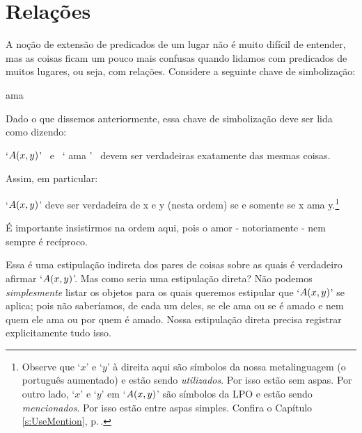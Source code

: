 \section{Relações}
A noção de extensão de predicados de um lugar não é muito difícil de entender, mas as coisas ficam um pouco mais confusas quando lidamos com predicados de muitos lugares, ou seja, com relações.
Considere a seguinte chave de simbolização:
\begin{center}
	\begin{ekey}
		\item[\atom{A}{x,y}]  ama 
	\end{ekey}
\end{center}
Dado o que dissemos anteriormente, essa chave de simbolização deve ser lida como dizendo:
	\begin{earg}
		\item[\textbullet] `$\mathord{A}(x,y)$'  \ e \ ` ama ' \ devem ser verdadeiras exatamente das mesmas coisas.
	\end{earg}
Assim, em particular:
	\begin{earg}
		\item[\textbullet] `$\mathord{A}(x,y)$' deve ser verdadeira de x e y (nesta ordem) se e somente se x ama y.\footnote{
			Observe que `$x$' e `$y$' à direita aqui são símbolos da nossa metalinguagem (o português aumentado) e estão sendo \emph{utilizados}.
			Por isso estão sem aspas.
			Por outro lado, `$x$' e `$y$' em `$\mathord{A}(x, y)$' são símbolos da LPO e estão sendo \emph{mencionados}.
			Por isso estão entre aspas simples.
			Confira o Capítulo \ref{s:UseMention}, p.\,\pageref{s:UseMention}.} 
	\end{earg}
É importante insistirmos na ordem aqui, pois o amor - notoriamente - nem sempre é recíproco.

Essa é uma estipulação indireta dos pares de coisas  sobre as quais é verdadeiro afirmar `$\mathord{A}(x,y)$'.
Mas como seria uma estipulação direta?
Não podemos \emph{simplesmente} listar os objetos para os quais queremos estipular que `$\mathord{A}(x,y)$' se aplica; pois não saberíamos, de cada um deles, se ele ama ou se é amado e nem quem ele ama ou por quem é amado.
Nossa estipulação direta precisa registrar explicitamente tudo isso.

